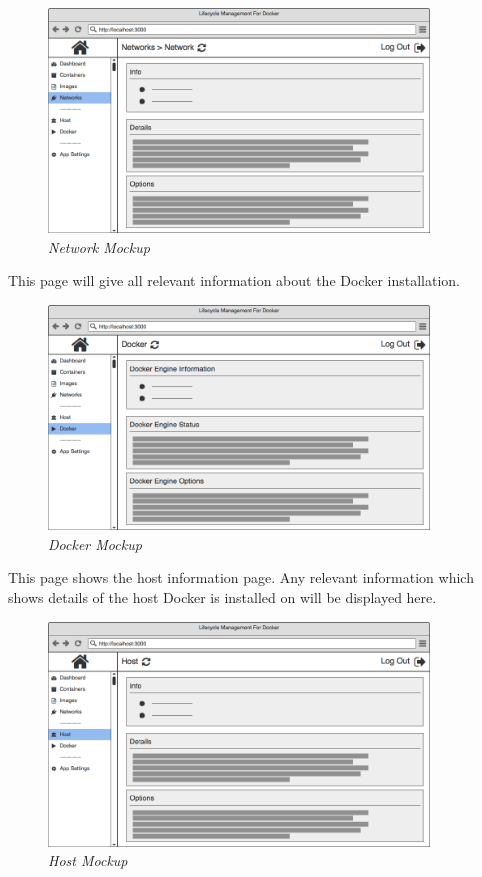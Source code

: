 \begin{figure}[!ht]
\centering
\includegraphics*[width=0.9\textwidth]{wireframes/network}
\caption{\em Network Mockup}
\end{figure}

\newpage
This page will give all relevant information about the Docker installation.
\begin{figure}[!ht]
\centering
\includegraphics*[width=0.9\textwidth]{wireframes/docker}
\caption{\em Docker Mockup}
\end{figure}
This page shows the host information page. Any relevant information which shows details of the host Docker is installed on will be displayed here.

\begin{figure}[!ht]
\centering
\includegraphics*[width=0.9\textwidth]{wireframes/host}
\caption{\em Host Mockup}
\end{figure}
